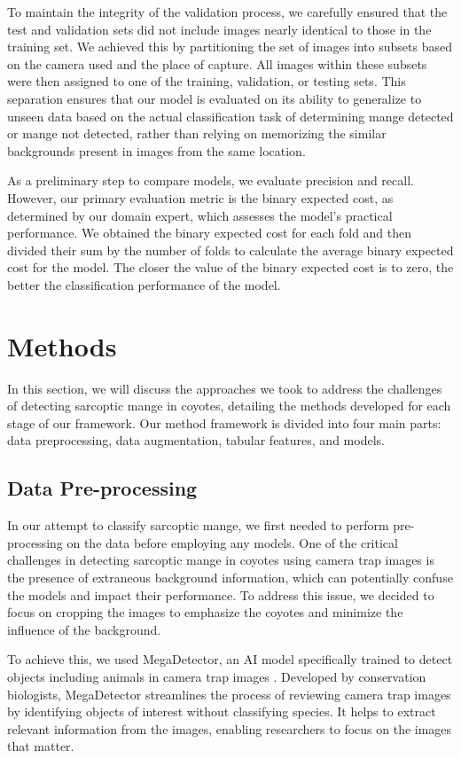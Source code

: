 \documentclass{article}
\begin{document}
To maintain the integrity of the validation process, we carefully ensured that the test and validation sets did not include images nearly identical to those in the training set. We achieved this by partitioning the set of images into subsets based on the camera used and the place of capture. All images within these subsets were then assigned to one of the training, validation, or testing sets. This separation ensures that our model is evaluated on its ability to generalize to unseen data based on the actual classification task of determining mange detected or mange not detected, rather than relying on memorizing the similar backgrounds present in images from the same location.

As a preliminary step to compare models, we evaluate precision and recall. However, our primary evaluation metric is the binary expected cost, as determined by our domain expert, which assesses the model's practical performance. We obtained the binary expected cost for each fold and then divided their sum by the number of folds to calculate the average binary expected cost for the model. The closer the value of the binary expected cost is to zero, the better the classification performance of the model.

\section{Methods}
In this section, we will discuss the approaches we took to address the challenges of detecting sarcoptic mange in coyotes, detailing the methods developed for each stage of our framework. Our method framework is divided into four main parts: data preprocessing, data augmentation, tabular features, and models.

\subsection{Data Pre-processing}
In our attempt to classify sarcoptic mange, we first needed to perform pre-processing on the data before employing any models. One of the critical challenges in detecting sarcoptic mange in coyotes using camera trap images is the presence of extraneous background information, which can potentially confuse the models and impact their performance. To address this issue, we decided to focus on cropping the images to emphasize the coyotes and minimize the influence of the background.

To achieve this, we used MegaDetector, an AI model specifically trained to detect objects including animals in camera trap images \cite{beery2019efficient, Fennell2022}. Developed by conservation biologists, MegaDetector streamlines the process of reviewing camera trap images by identifying objects of interest without classifying species. It helps to extract relevant information from the images, enabling researchers to focus on the images that matter.
\end{document}
